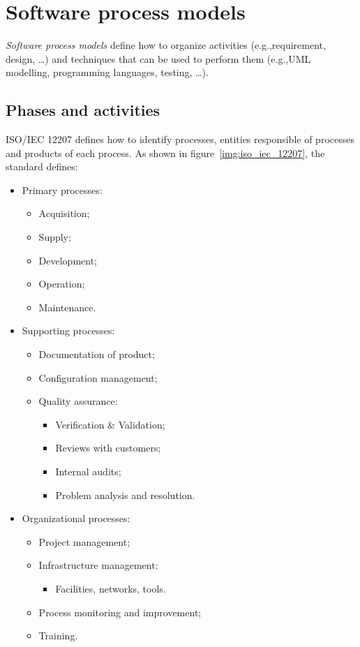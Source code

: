 \chapter{Software process models}
\emph{Software process models} define how to organize activities (e.g.,\@ requirement, design, \dots) and techniques that can be used to perform them (e.g.,\@ UML modelling, programming languages, testing, \dots).

\section{Phases and activities}
ISO/IEC 12207 defines how to identify processes, entities responsible of processes and products of each process. As shown in figure~\ref{img:iso_iec_12207}, the standard defines:
\begin{itemize}
\item Primary processes:
\begin{itemize}
\item Acquisition;
\item Supply;
\item Development;
\item Operation;
\item Maintenance.
\end{itemize}
\item Supporting processes:
\begin{itemize}
\item Documentation of product;
\item Configuration management;
\item Quality assurance:
\begin{itemize}
\item Verification \& Validation;
\item Reviews with customers;
\item Internal audits;
\item Problem analysis and resolution.
\end{itemize}
\end{itemize}
\item Organizational processes:
\begin{itemize}
\item Project management;
\item Infrastructure management:
\begin{itemize}
\item Facilities, networks, tools.
\end{itemize}
\item Process monitoring and improvement;
\item Training.
\end{itemize}
\end{itemize}

